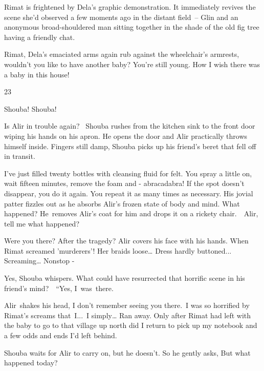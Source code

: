 \documentclass[twoside,11pt]{book}
\begin{document}
Rimat is frightened by Dela's graphic demonstration. It immediately revives the scene she'd observed a few moments ago
in the distant field\ {}-- Glin and an anonymous broad-shouldered man sitting together in the shade of the old fig tree
having a friendly chat.\ 

{\textquotedbl}Rimat,{\textquotedbl} Dela's emaciated arms again rub against the wheelchair's armrests,
{\textquotedbl}wouldn't you like to have another baby? You're still young. How I wish there was a baby in this
house!{\textquotedbl}


\bigskip

23~

{\textquotedbl}Shouba! Shouba!{\textquotedbl}

Is Alir in trouble again?~ Shouba rushes from the kitchen sink to the front door wiping his hands on his apron. He opens
the door and Alir practically throws himself inside. Fingers still damp, Shouba picks up his friend's beret that fell
off in transit. 

{\textquotedbl}I've just filled twenty bottles with cleansing fluid for felt. You spray a little on, wait fifteen
minutes, remove the foam and - abracadabra! If the spot doesn't disappear, you do it again. You repeat it as many times
as necessary.{\textquotedbl} His jovial patter fizzles out as he absorbs Alir's frozen state of body and mind.
{\textquotedbl}What happened?{\textquotedbl} He\ removes Alir's coat for him and drops it on a rickety
chair.\ \ {\textquotedbl}Alir, tell me what happened?{\textquotedbl} 

{\textquotedbl}Were you there? After the tragedy?{\textquotedbl} Alir covers his face with his hands.
{\textquotedbl}When Rimat screamed 'murderers'! Her braids loose{\dots} Dress hardly buttoned... Screaming{\dots}
Nonstop -{\textquotedbl}

{\textquotedbl}Yes,{\textquotedbl} Shouba whispers. What could have resurrected that horrific scene in his friend's
mind?\ \ {}``Yes, I\ was\ there.{\textquotedbl}

Alir~shakes his head, {\textquotedbl}I don't remember seeing you there.{\ }I was so horrified by Rimat's
screams that\ I...\ I simply{\dots} Ran away. Only after Rimat had left with the baby to go to that village up north
did I return to pick up my notebook and a few odds and ends I'd left behind.{\textquotedbl}

Shouba waits for Alir to carry on, but he doesn't. So he gently asks, {\textquotedbl}But what happened
today?{\textquotedbl} 
\end{document}
